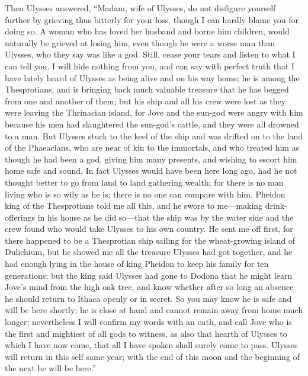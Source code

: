 Then Ulysses answered, “Madam, wife of Ulysses, do not disfigure yourself
further by grieving thus bitterly for your loss, though I can hardly blame you
for doing so. A woman who has loved her husband and borne him children, would
naturally be grieved at losing him, even though he were a worse man than
Ulysses, who they say was like a god. Still, cease your tears and listen to
what I can tell you. I will hide nothing from you, and can say with perfect
truth that I have lately heard of Ulysses as being alive and on his way home;
he is among the Thesprotians, and is bringing back much valuable treasure that
he has begged from one and another of them; but his ship and all his crew were
lost as they were leaving the Thrinacian island, for Jove and the sun-god were
angry with him because his men had slaughtered the sun-god’s cattle, and they
were all drowned to a man. But Ulysses stuck to the keel of the ship and was
drifted on to the land of the Phaeacians, who are near of kin to the immortals,
and who treated him as though he had been a god, giving him many presents, and
wishing to escort him home safe and sound. In fact Ulysses would have been here
long ago, had he not thought better to go from land to land gathering wealth;
for there is no man living who is so wily as he is; there is no one can compare
with him. Pheidon king of the Thesprotians told me all this, and he swore to
me—making drink-offerings in his house as he did so—that the ship was by the
water side and the crew found who would take Ulysses to his own country. He
sent me off first, for there happened to be a Thesprotian ship sailing for the
wheat-growing island of Dulichium, but he showed me all the treasure Ulysses
had got together, and he had enough lying in the house of king Pheidon to keep
his family for ten generations; but the king said Ulysses had gone to Dodona
that he might learn Jove’s mind from the high oak tree, and know whether after
so long an absence he should return to Ithaca openly or in secret. So you may
know he is safe and will be here shortly; he is close at hand and cannot remain
away from home much longer; nevertheless I will confirm my words with an oath,
and call Jove who is the first and mightiest of all gods to witness, as also
that hearth of Ulysses to which I have now come, that all I have spoken shall
surely come to pass. Ulysses will return in this self same year; with the end
of this moon and the beginning of the next he will be here.”


